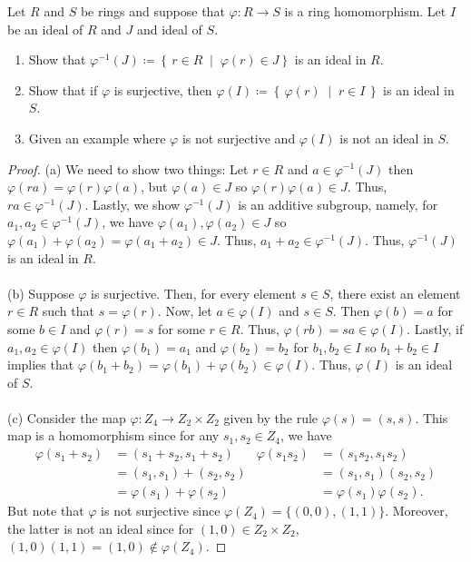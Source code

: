 \begin{problem}
Let $R$ and $S$ be rings and suppose that $\varphi\colon R\to S$ is a ring
homomorphism. Let $I$ be an ideal of $R$ and $J$ and ideal of $S$.
\begin{enumerate}[label=(\alph*)]
\item Show that $\varphi^{-1}(J)\coloneqq\left\{\,r\in
    R\;\middle|\;\varphi(r)\in J\right\}$ is an ideal in $R$.
\item Show that if $\varphi$ is surjective, then
  $\varphi(I)\coloneqq\left\{\,\varphi(r)\;\middle|\;r\in I\,\right\}$ is
  an ideal in $S$.
\item Given an example where $\varphi$ is not surjective and $\varphi(I)$
  is not an ideal in $S$.
\end{enumerate}
\end{problem}
\begin{proof}
(a) We need to show two things: Let $r\in R$ and $a\in\varphi^{-1}(J)$ then
$\varphi(ra)=\varphi(r)\varphi(a)$, but $\varphi(a)\in J$ so
$\varphi(r)\varphi(a)\in J$. Thus, $ra\in\varphi^{-1}(J)$. Lastly, we show
$\varphi^{-1}(J)$ is an additive subgroup, namely, for
$a_1,a_2\in\varphi^{-1}(J)$, we have $\varphi(a_1),\varphi(a_2)\in J$ so
$\varphi(a_1)+\varphi(a_2)=\varphi(a_1+a_2)\in J$. Thus,
$a_1+a_2\in\varphi^{-1}(J)$. Thus, $\varphi^{-1}(J)$ is an ideal in $R$.
\\\\
(b) Suppose $\varphi$ is surjective. Then, for every element $s\in S$,
there exist an element $r\in R$ such that $s=\varphi(r)$. Now, let
$a\in\varphi(I)$ and $s\in S$. Then $\varphi(b)=a$ for some $b\in I$ and
$\varphi(r)=s$ for some $r\in R$. Thus,
$\varphi(rb)=sa\in\varphi(I)$. Lastly, if $a_1,a_2\in\varphi(I)$ then
$\varphi(b_1)=a_1$ and $\varphi(b_2)=b_2$ for $b_1,b_2\in I$ so $b_1+b_2\in
I$ implies that
$\varphi(b_1+b_2)=\varphi(b_1)+\varphi(b_2)\in\varphi(I)$. Thus,
$\varphi(I)$ is an ideal of $S$.
\\\\
(c) Consider the map $\varphi\colon Z_4\to Z_2\times Z_2$ given by the rule
$\varphi(s)=(s,s)$. This map is a homomorphism since for any $s_1,s_2\in
Z_4$, we have
\begin{align*}
\varphi(s_1+s_2)&=(s_1+s_2,s_1+s_2)&
\varphi(s_1s_2)&=(s_1s_2,s_1s_2)\\
                &=(s_1,s_1)+(s_2,s_2)&
               &=(s_1,s_1)(s_2,s_2)\\
                &=\varphi(s_1)+\varphi(s_2)&
               &=\varphi(s_1)\varphi(s_2).
\end{align*}
But note that $\varphi$ is not surjective since
$\varphi(Z_4)=\{(0,0),(1,1)\}$. Moreover, the latter is not an ideal since
for $(1,0)\in Z_2\times Z_2$, $(1,0)(1,1)=(1,0)\notin\varphi(Z_4)$.
\end{proof}

